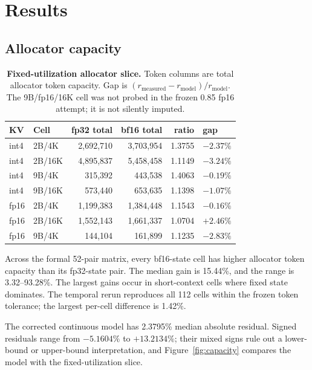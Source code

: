 \documentclass[conference,letterpaper,10pt]{IEEEtran}
\begin{document}
\section{Results}
\label{sec:results}

\subsection{Allocator capacity}
\label{sec:capacity}

\begin{table}[t]
\centering
\scriptsize
\caption{\textbf{Fixed-utilization allocator slice.} Token columns are total
allocator token capacity. Gap is
$(r_{\mathrm{measured}}-r_{\mathrm{model}})/r_{\mathrm{model}}$. The
9B/fp16/16K cell was not probed in the frozen 0.85 fp16 attempt; it is not
silently imputed.}
\label{tab:capacity}
\setlength{\tabcolsep}{3.1pt}
\begin{tabular}{llrrrl}
\toprule
KV & Cell & fp32 total & bf16 total & ratio & gap\\
\midrule
int4 & 2B/4K  & 2,692,710 & 3,703,954 & 1.3755 & $-2.37\%$\\
int4 & 2B/16K & 4,895,837 & 5,458,458 & 1.1149 & $-3.24\%$\\
int4 & 9B/4K  &   315,392 &   443,538 & 1.4063 & $-0.19\%$\\
int4 & 9B/16K &   573,440 &   653,635 & 1.1398 & $-1.07\%$\\
fp16 & 2B/4K  & 1,199,383 & 1,384,448 & 1.1543 & $-0.16\%$\\
fp16 & 2B/16K & 1,552,143 & 1,661,337 & 1.0704 & $+2.46\%$\\
fp16 & 9B/4K  &   144,104 &   161,899 & 1.1235 & $-2.83\%$\\
\bottomrule
\end{tabular}
\end{table}

Across the formal 52-pair matrix, every bf16-state cell has higher allocator
token capacity than its fp32-state pair. The median gain is 15.44\%, and the
range is 3.32--93.28\%. The largest gains occur in short-context cells where
fixed state dominates. The temporal rerun reproduces all 112 cells within the
frozen token tolerance; the largest per-cell difference is 1.42\%.

The corrected continuous model has 2.3795\% median absolute residual. Signed
residuals range from $-5.1604\%$ to $+13.2134\%$; their mixed signs rule out a
lower-bound or upper-bound interpretation, and Figure~\ref{fig:capacity}
compares the model with the fixed-utilization slice.
\end{document}
